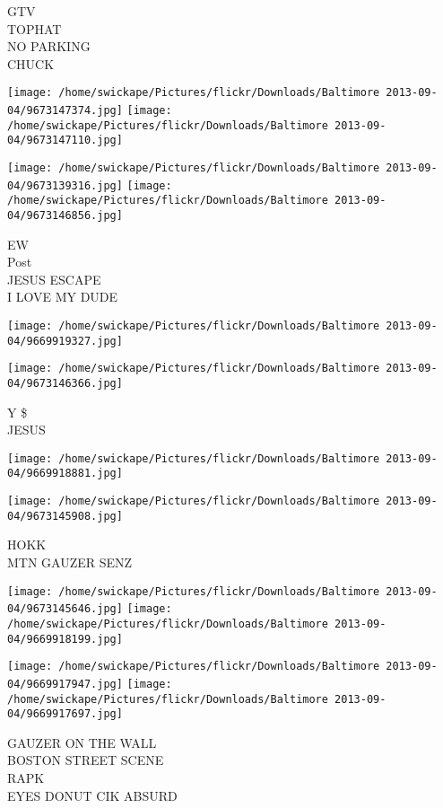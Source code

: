 \documentclass[10pt,letterpaper]{article}
\begin{document}
GTV\\
TOPHAT\\
NO PARKING\\
CHUCK
\pagebreak

\texttt{[image: /home/swickape/Pictures/flickr/Downloads/Baltimore 2013-09-04/9673147374.jpg]}
\texttt{[image: /home/swickape/Pictures/flickr/Downloads/Baltimore 2013-09-04/9673147110.jpg]}

\texttt{[image: /home/swickape/Pictures/flickr/Downloads/Baltimore 2013-09-04/9673139316.jpg]}
\texttt{[image: /home/swickape/Pictures/flickr/Downloads/Baltimore 2013-09-04/9673146856.jpg]}

EW\\
Post\\
JESUS ESCAPE\\
I LOVE MY DUDE
\pagebreak

\texttt{[image: /home/swickape/Pictures/flickr/Downloads/Baltimore 2013-09-04/9669919327.jpg]}

\vspace{0.25in}
\texttt{[image: /home/swickape/Pictures/flickr/Downloads/Baltimore 2013-09-04/9673146366.jpg]}

Y \$\\
JESUS
\pagebreak

\texttt{[image: /home/swickape/Pictures/flickr/Downloads/Baltimore 2013-09-04/9669918881.jpg]}

\vspace{0.25in}
\texttt{[image: /home/swickape/Pictures/flickr/Downloads/Baltimore 2013-09-04/9673145908.jpg]}

HOKK\\
MTN GAUZER SENZ
\pagebreak

\texttt{[image: /home/swickape/Pictures/flickr/Downloads/Baltimore 2013-09-04/9673145646.jpg]}
\texttt{[image: /home/swickape/Pictures/flickr/Downloads/Baltimore 2013-09-04/9669918199.jpg]}

\texttt{[image: /home/swickape/Pictures/flickr/Downloads/Baltimore 2013-09-04/9669917947.jpg]}
\texttt{[image: /home/swickape/Pictures/flickr/Downloads/Baltimore 2013-09-04/9669917697.jpg]}

GAUZER ON THE WALL\\
BOSTON STREET SCENE\\
RAPK\\
EYES DONUT CIK ABSURD
\pagebreak
\end{document}
